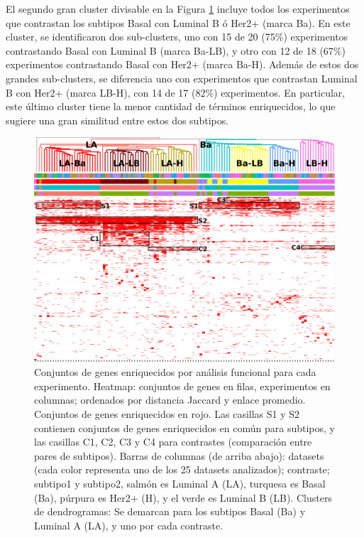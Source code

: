 \documentclass[12pt,twoside]{reedthesis}
\begin{document}
El segundo gran cluster divisable en la Figura \ref{fig:migsa2} incluye todos los experimentos que contrastan los subtipos Basal con Luminal B ó Her2+ (marca Ba). En este cluster, se identificaron dos sub-clusters, uno con 15 de 20 (75\%) experimentos contrastando Basal con Luminal B (marca Ba-LB), y otro con 12 de 18 (67\%) experimentos contrastando Basal con Her2+ (marca Ba-H). Además de estos dos grandes sub-clusters, se diferencia uno con experimentos que contrastan Luminal B con Her2+ (marca LB-H), con 14 de 17 (82\%) experimentos. En particular, este último cluster tiene la menor cantidad de términos enriquecidos, lo que sugiere una gran similitud entre estos dos subtipos.
\begin{figure}

{\centering \includegraphics[width=1\linewidth]{images/MIGSA_FIG2} 

}

\caption{Conjuntos de genes enriquecidos por análisis funcional para cada experimento. Heatmap: conjuntos de genes en filas, experimentos en columnas; ordenados por distancia Jaccard y enlace promedio. Conjuntos de genes enriquecidos en rojo. Las casillas S1 y S2 contienen conjuntos de genes enriquecidos en común para subtipos, y las casillas C1, C2, C3 y C4 para contrastes (comparación entre pares de subtipos). Barras de columnas (de arriba abajo): datasets (cada color representa uno de los 25 datasets analizados); contraste; subtipo1 y subtipo2, salmón es Luminal A (LA), turquesa es Basal (Ba), púrpura es Her2+ (H), y el verde es Luminal B (LB). Clusters de dendrogramas: Se demarcan para los subtipos Basal (Ba) y Luminal A (LA), y uno por cada contraste.}\label{fig:migsa2}
\end{figure}
\end{document}
